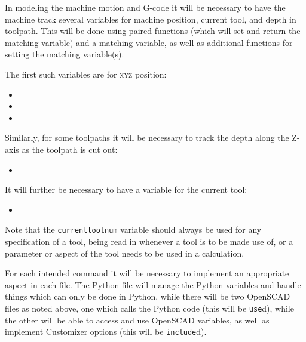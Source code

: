 \documentclass{ltxdoc}
\begin{document}
In modeling the machine motion and G-code it will be necessary to have the machine track several variables for machine position, current tool, and depth in toolpath. This will be done using paired functions (which will set and return the  matching variable) and a matching variable, as well as additional functions for setting the matching variable(s).

\begin{samepage}
The first such variables are for \textsc{xyz} position:

\begin{itemize}
 \item {}
 \item {}
 \item {}
\end{itemize}
\end{samepage}

\begin{samepage}
\noindent Similarly, for some toolpaths it will be necessary to track the depth along the Z-axis as the toolpath is cut out:
 
\begin{itemize}
 \item {}
\end{itemize}
\end{samepage}

\begin{samepage}
\noindent It will further be necessary to have a variable for the current tool:

\begin{itemize}
 \item {}
\end{itemize}
\end{samepage}

Note that the \verb|currenttoolnum| variable should always be used for any specification of a tool, being read in whenever a tool is to be made use of, or a parameter or aspect of the tool needs to be used in a calculation. %

For each intended command it will be necessary to implement an appropriate aspect in each file. The Python file will manage the Python variables and handle things which can only be done in Python, while there will be two OpenSCAD files as noted above, one which calls the Python code (this will be \texttt{use}d), while the other will be able to access and use OpenSCAD variables, as well as implement Customizer options (this will be \texttt{include}d).
\end{document}
